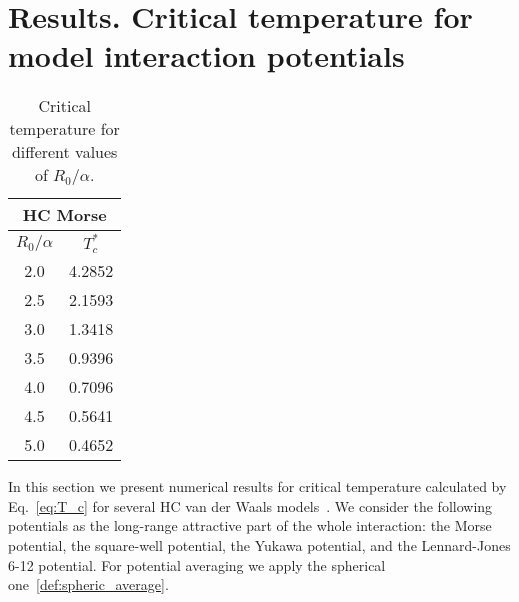 \section{\label{sec:results}Results. Critical temperature for model interaction potentials}

\begin{table}[h]
	\noindent\caption{Critical temperature for different values of $R_0/\alpha$.}\vskip3mm
	\begin{tabular}{|c|c|}
		\hline
		\multicolumn{2}{|c|}{HC Morse} \\
		\hline
		$R_0/\alpha$ \quad & $T_c^*$ \\
		\hline
		2.0  & 4.2852 \\
		2.5  & 2.1593 \\
		3.0  & 1.3418 \\
		3.5  & 0.9396 \\
		4.0  & 0.7096 \\
		4.5  & 0.5641 \\
		5.0  & 0.4652 \\
		\hline
	\end{tabular}
	\label{tab:morse_temp_cr}
\end{table}

In this section we present numerical results for critical temperature calculated by Eq.~\eqref{eq:T_c} for several HC van der Waals models~\cite{KreiciNezbeda2012}. We consider the following potentials as the long-range attractive part of the whole interaction: the Morse potential, the square-well potential, the Yukawa potential, and the Lennard-Jones 6-12 potential. For potential averaging we apply the spherical one~\eqref{def:spheric_average}.

